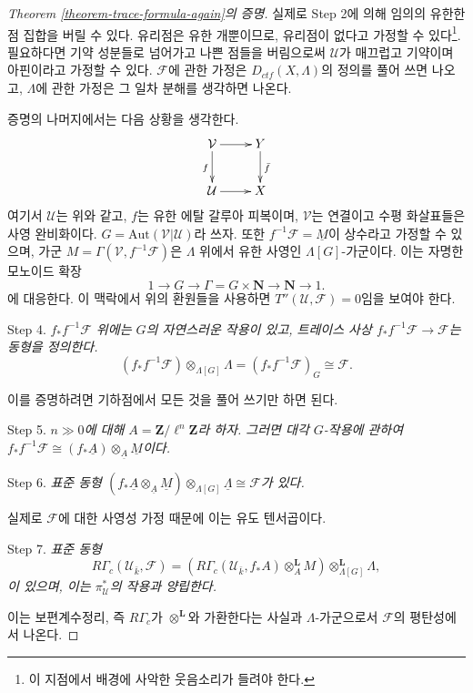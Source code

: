 \begin{proof}[Theorem \ref{theorem-trace-formula-again}의 증명]
\medskip\noindent
실제로 Step 2에 의해 임의의 유한한 점 집합을 버릴 수 있다. 유리점은
유한 개뿐이므로, 유리점이 없다고 가정할 수 있다\footnote{이 지점에서
배경에 사악한 웃음소리가 들려야 한다.}. 필요하다면 기약 성분들로
넘어가고 나쁜 점들을 버림으로써 $\mathcal{U}$가 매끄럽고 기약이며
아핀이라고 가정할 수 있다. $\mathcal{F}$에 관한 가정은
$D_{ctf}(X, \Lambda)$의 정의를 풀어 쓰면 나오고, $\Lambda$에 관한
가정은 그 일차 분해를 생각하면 나온다.

\medskip\noindent
증명의 나머지에서는 다음 상황을 생각한다.
$$
\xymatrix{
\mathcal{V} \ar[d]_f \ar[r] & Y \ar[d]^{\bar f} \\
\mathcal{U} \ar[r] & X
}
$$
여기서 $\mathcal{U}$는 위와 같고, $f$는 유한 에탈 갈루아 피복이며,
$\mathcal{V}$는 연결이고 수평 화살표들은 사영 완비화이다.
$G=\text{Aut}(\mathcal{V}|\mathcal{U})$라 쓰자. 또한
$f^{-1}\mathcal{F} =\underline M$이 상수라고 가정할 수 있으며,
가군 $M = \Gamma(\mathcal{V}, f^{-1}\mathcal{F})$은
$\Lambda$ 위에서 유한 사영인 $\Lambda[G]$-가군이다. 이는 자명한
모노이드 확장
$$
1\to G\to \Gamma = G \times \mathbf{N}\to \mathbf{N}\to 1.
$$
에 대응한다. 이 맥락에서 위의 환원들을 사용하면
$T''(\mathcal{U}, \mathcal{F}) = 0$임을 보여야 한다.

\medskip\noindent
Step 4. {\it $f_*f^{-1}\mathcal{F}$ 위에는 $G$의 자연스러운 작용이
있고, 트레이스 사상 $f_*f^{-1}\mathcal{F}\to \mathcal{F}$는
동형을 정의한다.}
$$
(f_*f^{-1}\mathcal{F})\otimes_{\Lambda[G]} \Lambda =
(f_*f^{-1}\mathcal{F})_G \cong \mathcal{F}.
$$

\medskip\noindent
이를 증명하려면 기하점에서 모든 것을 풀어 쓰기만 하면 된다.

\medskip\noindent
Step 5. {\it $n\gg 0$에 대해
$A = \mathbf{Z}/\ell^n \mathbf{Z}$라 하자. 그러면 대각 $G$-작용에
관하여 $f_*f^{-1}\mathcal{F} \cong (f_*\underline A)
\otimes_{\underline A} \underline M$이다.}

\medskip\noindent
Step 6. {\it 표준 동형
$(f_*\underline A \otimes_{\underline A} \underline M)
\otimes_{\Lambda[G]} \underline \Lambda \cong \mathcal{F}$가 있다.
}

\medskip\noindent
실제로 $\mathcal{F}$에 대한 사영성 가정 때문에 이는 유도 텐서곱이다.

\medskip\noindent
Step 7. {\it 표준 동형
$$
R\Gamma_c(\mathcal{U}_{\bar k}, \mathcal{F})
= (R\Gamma_c(\mathcal{U}_{\bar k}, f_*A)\otimes_A^\mathbf{L}
M)\otimes_{\Lambda[G]}^\mathbf{L} \Lambda,
$$
이 있으며, 이는 $\pi^*_\mathcal{U}$의 작용과 양립한다.
}

\medskip\noindent
이는 보편계수정리, 즉 $R\Gamma_c$가
$\otimes^\mathbf{L}$와 가환한다는 사실과 $\Lambda$-가군으로서
$\mathcal{F}$의 평탄성에서 나온다.


\end{proof}
